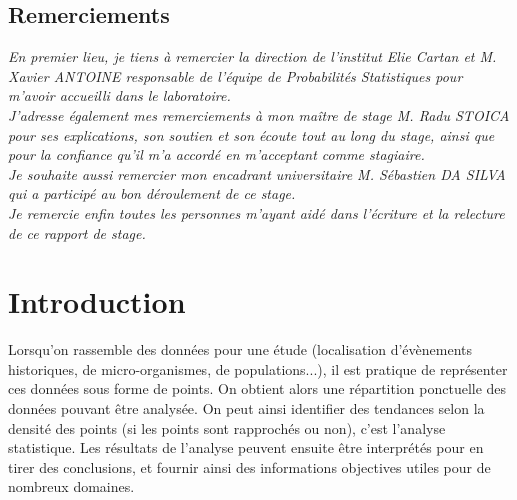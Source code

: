 \documentclass[stage2a]{tnreport}
\begin{document}
  
\maketitle
{}


\cleardoublepage

\makesecondtitle

\section*{Remerciements}

{\em
En premier lieu, je tiens à remercier la direction de l'institut Elie Cartan et M. Xavier ANTOINE responsable de l'équipe de Probabilités Statistiques pour m'avoir accueilli dans le laboratoire.\\

J'adresse également mes remerciements à mon maître de stage M. Radu STOICA pour ses explications, son soutien et son écoute tout au long du stage, ainsi que pour la confiance qu'il m'a accordé en m'acceptant comme stagiaire.\\

Je souhaite aussi remercier mon encadrant universitaire M. Sébastien DA SILVA qui a participé au bon déroulement de ce stage.\\

Je remercie enfin toutes les personnes m'ayant aidé dans l'écriture et la relecture de ce rapport de stage.
}

\cleardoublepage

\renewcommand{\baselinestretch}{0.5}\normalsize
\tableofcontents
\renewcommand{\baselinestretch}{1.0}\normalsize
\cleardoublepage

\setcounter{page}{1}

\chapter{Introduction}


Lorsqu'on rassemble des données pour une étude (localisation d'évènements historiques, de micro-organismes, de populations...), il est pratique de représenter ces données sous forme de points. On obtient alors une répartition ponctuelle des données pouvant être analysée. On peut ainsi identifier des tendances selon la densité des points (si les points sont rapprochés ou non), c'est l'analyse statistique. Les résultats de l'analyse peuvent ensuite être interprétés pour en tirer des conclusions, et fournir ainsi des informations objectives utiles pour de nombreux domaines.
\end{document}
